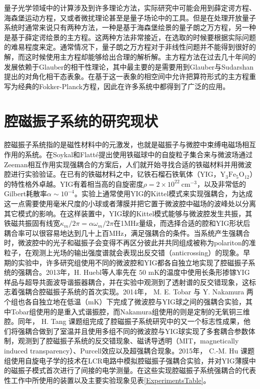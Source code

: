 量子光学领域中的计算涉及到许多理论方法，实际研究中可能会用到薛定谔方程、海森堡运动方程，又或者微扰理论甚至是量子场论中的工具。但是在处理开放量子系统时通常来说只有两种方法，一种是基于海森堡绘景的量子朗之万方程，另一种是基于薛定谔绘景的主方程\cite{carmichael1999statistical}。这两种方法非常接近，在选取的时候要根据实际问题的难易程度来定。通常情况下，量子朗之万方程对于非线性问题并不能得到很好的解，而这时候使用主方程却能够给出合理的解析解。主方程方法在过去几十年间的发展依赖于Glauber的相干性理论，其中最主要的是需要用到Glauber与Sudarshan提出的对角化相干态表象。在基于这一表象的相空间中允许把算符形式的主方程重写为经典的Fokker-Planck方程，因此在许多系统中都得到了广泛的应用。

\section{腔磁振子系统的研究现状}
腔磁振子系统指的是磁性材料中的元激发，也就是磁振子与微腔中束缚电磁场相互作用的系统。在Soykal和Flatt\'e提出使用铁磁球中的自旋粒子集合来与微波场通过Zeeman相互作用实现强耦合的方案后，人们就开始寻找合适的铁磁材料并用微波腔进行实验验证。在已有的铁磁材料之中，钇铁石榴石铁氧体（YIG，$\mathrm{Y_3Fe_5O_{12}}$）的特性格外卓越。YIG有着相当高的自旋密度$\rho=2\times10^{22}~\mathrm{cm}^{-3}$，以及非常低的Gilbert耗散率$\alpha \sim 10^{-4}$。实验上通常使用YIG的Kittel模式来实现强耦合，为达成这一点需要使用毫米尺度的小球或者薄膜并把它置于微波腔中磁场的波峰处以分离其它模式的影响。在这样装置中，YIG球的Kittel模式能够与微波腔发生共振，其铁磁共振固有线宽$\kappa_m/2\pi=\alpha \omega_m/2\pi$在1MHz量级，而选择合适的腔和YIG形状后耦合率可以很容易地达到几十上百MHz，满足强耦合的条件。当系统产生强耦合时，微波腔中的光子和磁振子会变得不再区分彼此并共同组成被称为polariton的准粒子，在观测上光场的输出强度谱就会表现出反交错（anticrossing）的现象。早期的实验中，许多研究组使用不同的微波腔和YIG都各自独立地实现了腔磁振子系统的强耦合。2013年，H. Huebl等人率先在 $50$ mK的温度中使用长条形掺镓YIG样品与超导共面波导谐振器耦合，并在实验中观测到了透射谱的反交错现象\cite{PhysRevLett.111.127003Huebl}，这标志着强耦合腔磁振子系统的首次实现。2014年， M. E. Tobar 与 Y. Nakamura 两个组也各自独立地在低温（mK）下完成了微波腔与YIG球之间的强耦合实验，其中Tobar组使用的是重入式谐振腔\cite{PhysRevApplied.2.054002Tobar}，而Nakamura组使用的则是定制的无氧铜三维腔\cite{PhysRevLett.113.083603Nakamura}。同年， H. Tang 课题组完成了腔磁振子系统研究中的又一个标志性成果，他们将强耦合做到了室温并且使用多组不同的微波腔与YIG球实现了多套耦合参数体制，观测到了腔磁振子系统的反交错现象、磁诱导透明（MIT，magnetically induced transparency）、Purcell效应以及超强耦合现象\cite{PhysRevLett.113.156401Tang}。2015年， C.-M. Hu 课题组使用自旋电子学的技术在LCR电路中模拟腔磁振子强耦合实验，并对YIG薄膜中的磁振子模式首次进行了间接的电学测量\cite{PhysRevLett.114.227201Hu}。在这些实现腔磁振子系统强耦合的代表性工作中所使用的装置以及主要实验现象见表\ref{ExperimentsTable}。
